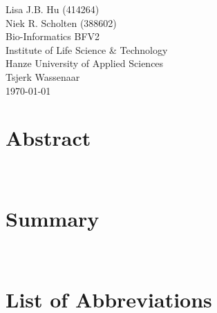\normalsize
\vspace*{\fill}
\begin{flushright}
Lisa J.B. Hu (414264)\\
Niek R. Scholten (388602)\\
Bio-Informatics BFV2\\
Institute of Life Science \& Technology\\
Hanze University of Applied Sciences\\
Tsjerk Wassenaar\\
\today
\end{flushright}
\newpage

\section*{Abstract}

\label{sec:abstract}~
\newpage

\section*{Summary}

\label{sec:summ}~
\newpage

\section*{List of Abbreviations}

\label{sec:abvs}~

\newpage